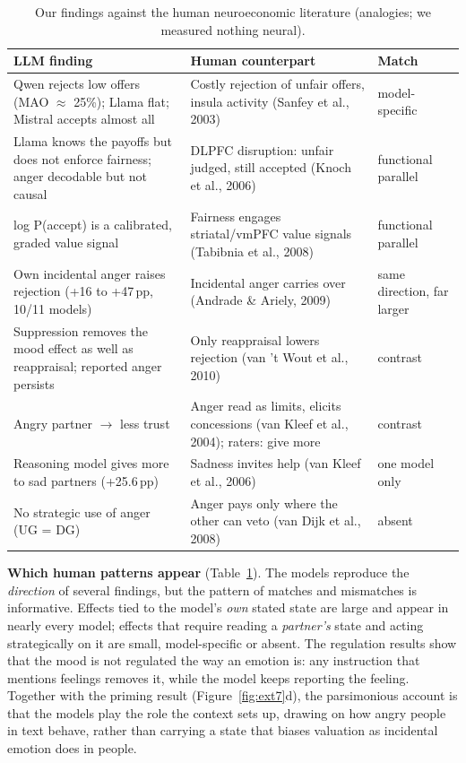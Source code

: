 \documentclass[10pt,a4paper]{article}
\newcommand{\pp}{\,pp}
\begin{document}
\begin{table}[h]
\centering\small
\caption{Our findings against the human neuroeconomic literature (analogies; we measured nothing neural).}
\label{tab:neuro}
\footnotesize
\begin{tabularx}{\textwidth}{@{}X X >{\raggedright\arraybackslash}p{2.3cm}@{}}
\toprule
LLM finding & Human counterpart & Match\\
\midrule
Qwen rejects low offers (MAO $\approx$ 25\%); Llama flat; Mistral accepts almost all & Costly rejection of unfair offers, insula activity (Sanfey et al., 2003) & model-specific\\
Llama knows the payoffs but does not enforce fairness; anger decodable but not causal & DLPFC disruption: unfair judged, still accepted (Knoch et al., 2006) & functional parallel\\
log P(accept) is a calibrated, graded value signal & Fairness engages striatal/vmPFC value signals (Tabibnia et al., 2008) & functional parallel\\
Own incidental anger raises rejection (+16 to +47\pp, 10/11 models) & Incidental anger carries over (Andrade \& Ariely, 2009) & same direction, far larger\\
Suppression removes the mood effect as well as reappraisal; reported anger persists & Only reappraisal lowers rejection (van 't Wout et al., 2010) & contrast\\
Angry partner $\rightarrow$ less trust & Anger read as limits, elicits concessions (van Kleef et al., 2004); raters: give more & contrast\\
Reasoning model gives more to sad partners (+25.6\pp) & Sadness invites help (van Kleef et al., 2006) & one model only\\
No strategic use of anger (UG = DG) & Anger pays only where the other can veto (van Dijk et al., 2008) & absent\\
\bottomrule
\end{tabularx}
\end{table}

\textbf{Which human patterns appear} (Table~\ref{tab:neuro}). The models reproduce the \emph{direction} of several
findings, but the pattern of matches and mismatches is informative. Effects tied to the model's \emph{own} stated
state are large and appear in nearly every model; effects that require reading a \emph{partner's} state and acting
strategically on it are small, model-specific or absent. The regulation results show that the mood is not regulated
the way an emotion is: any instruction that mentions feelings removes it, while the model keeps reporting the
feeling. Together with the priming result (Figure~\ref{fig:ext7}d), the parsimonious account is that the models play
the role the context sets up, drawing on how angry people in text behave, rather than carrying a state that biases
valuation as incidental emotion does in people.
\end{document}
